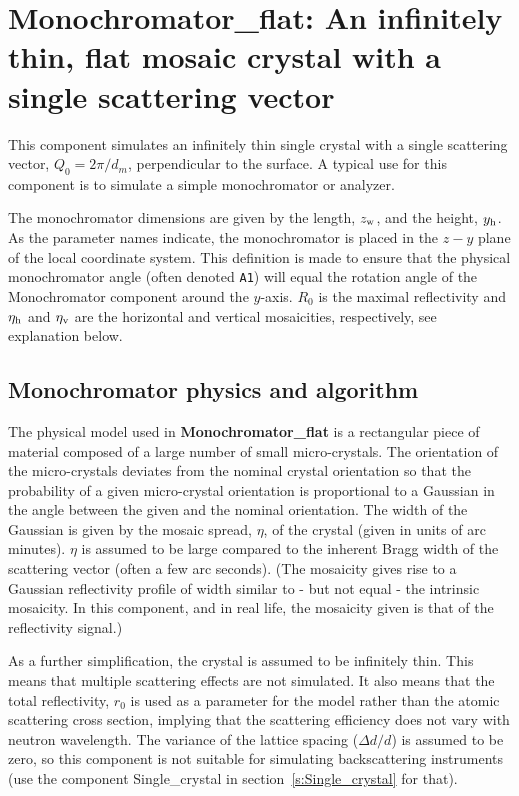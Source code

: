 \section{Monochromator\_flat: An infinitely thin, flat mosaic crystal with
a single scattering vector}
\label{s:monochromator_flat}


This component simulates an infinitely thin single
crystal with a single scattering vector, $Q_0=2\pi / d_m$, perpendicular to the
surface. A typical
use for this component is to simulate a simple monochromator or analyzer.

The monochromator dimensions are given by the length, $z_{\rm w}$, and
the height, $y_{\rm h}$. As the parameter names indicate, the
monochromator is placed in the $z-y$ plane of the local coordinate system.
This definition is made to ensure that the physical monochromator angle
(often denoted \verb+A1+) will equal the \MCS rotation angle
of the Monochromator component around the $y$-axis.
$R_0$ is the maximal reflectivity and
$\eta_{\rm h}$ and $\eta_{\rm v}$ are the horizontal and vertical mosaicities,
respectively, see explanation below.

\subsection{Monochromator physics and algorithm}
The physical model used in {\bf Monochromator\_flat} is a rectangular piece of
material composed of a large number of small micro-crystals.
The orientation of the
micro-crystals deviates from the nominal crystal orientation so that the
probability of a given micro-crystal orientation is proportional to a
Gaussian in the angle between the given and the nominal orientation. The
width of the Gaussian is given by the mosaic spread, $\eta$, of the crystal
(given in units of arc minutes).
$\eta$ is assumed to be large compared to the inherent Bragg width of the
scattering vector (often a few arc seconds).
(The mosaicity gives rise to a Gaussian reflectivity profile of width
similar to - but not equal - the intrinsic mosaicity.
In this component, and in real life, the mosaicity given is that of the
reflectivity signal.)

As a further simplification, the crystal is assumed to be infinitely
thin. This means that multiple scattering effects are not simulated. It
also means that the total reflectivity, $r_0$ is used as a parameter for
the model rather than the atomic scattering cross section, implying that
the scattering efficiency does not vary with neutron wavelength.
The variance
of the lattice spacing ($\Delta d/d$) is assumed to be zero, so this
component is not suitable for simulating backscattering instruments (use
the component {\rm Single\_crystal}
in section~\ref{s:Single_crystal} for that).

